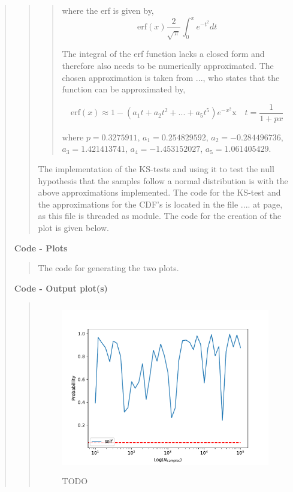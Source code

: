 \begin{quote}
\begin{quote}
\begin{quote}
where the erf is given by,
\begin{equation}
\text{erf}(x)  \frac{2}{\sqrt{\pi}} \int_0^{x} e^{-t^2} dt
\end{equation}

The integral of the erf function lacks a closed form and therefore also needs to be numerically approximated. The chosen approximation is taken from ..., who states that the function can be 
approximated by,

\begin{equation}
\text{erf}(x) \approx 1- (a_1t+a_2t^2 + ... + a_5t^5)e^{-x^2} \text{x} \quad t = \frac{1}{1+px}
\end{equation}

where $p  =0.3275911$, $a_1 =  0.254829592$, $a_2 = -0.284496736$, $a_3 = 1.421413741$, $a_4 =  -1.453152027$, $a_5 = 1.061405429$.
\end{quote}

The implementation of the KS-tests and using it to test the null hypothesis that the samples follow a normal distribution is with the above approximations implemented. The code for the KS-test and the approximations for the CDF's is located in the file .... at page, as this file is threaded as module. The code for the creation of the plot is given below.  
\end{quote}

\newpage
\textbf{Code - Plots}

\begin{quote}
The code for generating the two plots.

\end{quote}
\newpage

\textbf{Code - Output plot(s)}
\begin{quote}
\begin{figure}[!ht]
\centering
\includegraphics[width=12cm, height=7.5cm]{./Plots/1_plot_ks_test_self.pdf}
\caption{TODO}
\end{figure}


\end{quote}
\end{quote}

